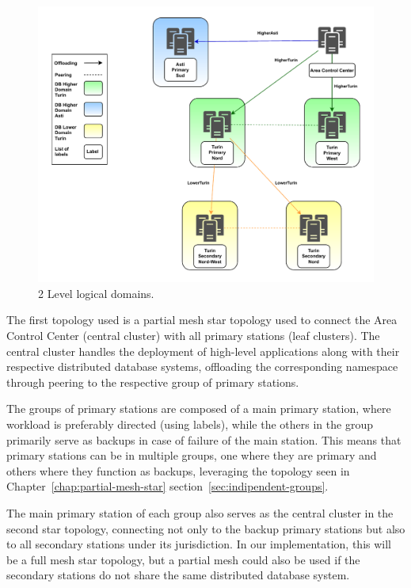 \begin{figure}[ht]\centering
\includegraphics[scale=0.7]{Pictures/2level}
\caption{2 Level logical domains.}\label{fig:level-imp}
\end{figure}

The first topology used is a partial mesh star topology used to connect the Area Control Center (central cluster) with all primary stations (leaf clusters). The central cluster handles the deployment of high-level applications along with their respective distributed database systems, offloading the corresponding namespace through peering to the respective group of primary stations.

The groups of primary stations are composed of a main primary station, where workload is preferably directed (using labels), while the others in the group primarily serve as backups in case of failure of the main station. This means that primary stations can be in multiple groups, one where they are primary and others where they function as backups, leveraging the topology seen in Chapter~\ref{chap:partial-mesh-star} section~\ref{sec:indipendent-groups}.

The main primary station of each group also serves as the central cluster in the second star topology, connecting not only to the backup primary stations but also to all secondary stations under its jurisdiction. In our implementation, this will be a full mesh star topology, but a partial mesh could also be used if the secondary stations do not share the same distributed database system.

